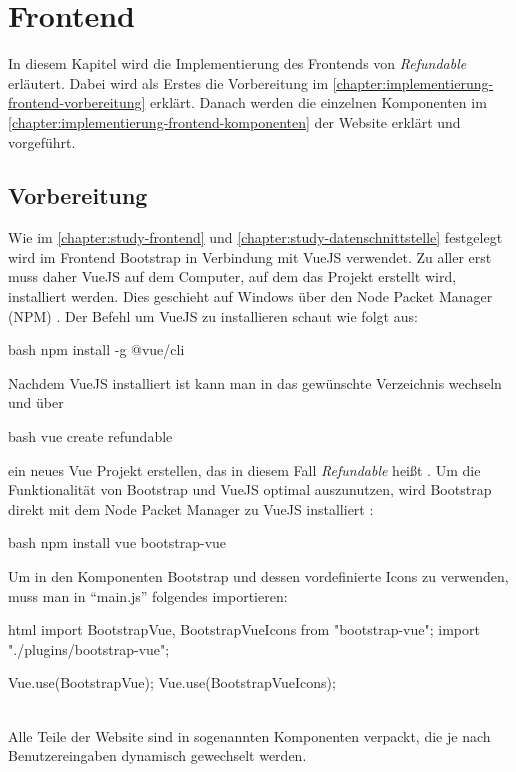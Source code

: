 \section{Frontend}
\label{chapter:implementierung-frontend}
In diesem Kapitel wird die Implementierung des Frontends von \textit{Refundable} erläutert. Dabei wird als Erstes die Vorbereitung im \autoref{chapter:implementierung-frontend-vorbereitung} erklärt. Danach werden die einzelnen Komponenten im \autoref{chapter:implementierung-frontend-komponenten} der Website erklärt und vorgeführt.
\subsection{Vorbereitung}
\label{chapter:implementierung-frontend-vorbereitung}
Wie im \autoref{chapter:study-frontend} und \autoref{chapter:study-datenschnittstelle} festgelegt wird im Frontend Bootstrap in Verbindung mit VueJS verwendet. Zu aller erst muss daher VueJS auf dem Computer, auf dem das Projekt erstellt wird, installiert werden. Dies geschieht auf Windows über den Node Packet Manager (NPM) \cite{vue-install}. Der Befehl um VueJS zu installieren schaut wie folgt aus:
\begin{code}{bash}
	npm install -g @vue/cli
\end{code}
Nachdem VueJS installiert ist kann man in das gewünschte Verzeichnis wechseln und über
\begin{code}{bash}
	vue create refundable
\end{code}
ein neues Vue Projekt erstellen, das in diesem Fall \textit{Refundable} heißt \cite{vue-create-project}. Um die Funktionalität von Bootstrap und VueJS optimal auszunutzen, wird Bootstrap direkt mit dem Node Packet Manager zu VueJS installiert \cite{bootstrap-vue-getting-started}:
\begin{code}{bash}
	npm install vue bootstrap-vue
\end{code}
Um in den Komponenten Bootstrap und dessen vordefinierte Icons zu verwenden, muss man in \enquote{main.js} folgendes importieren:
\begin{code}{html}
	import { BootstrapVue, BootstrapVueIcons } from "bootstrap-vue";
	import "./plugins/bootstrap-vue";
	
	Vue.use(BootstrapVue);
	Vue.use(BootstrapVueIcons);
\end{code}
	\label{list:requcommands} ~\\
Alle Teile der Website sind in sogenannten Komponenten verpackt, die je nach Benutzereingaben dynamisch gewechselt werden. 

